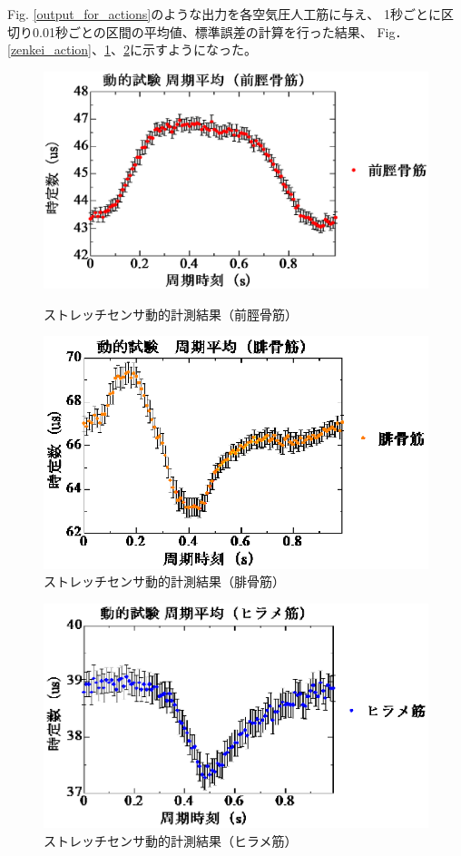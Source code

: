 Fig. \ref{output_for_actions}のような出力を各空気圧人工筋に与え、
1秒ごとに区切り0.01秒ごとの区間の平均値、標準誤差の計算を行った結果、
Fig．\ref{zenkei_action}、\ref{hikotsu_action}、\ref{hirame_action}に示すようになった。
\begin{figure}[h]
  \begin{center}
  \includegraphics[width=0.75\columnwidth,clip]{./4_consideration/moving/zenkei.eps}
  \caption{ストレッチセンサ動的計測結果（前脛骨筋）}
  \label{zenkei_action}
  \end{center}
  \begin{center}
  \includegraphics[width=0.75\columnwidth,clip]{./4_consideration/moving/hikotsu.eps}
  \caption{ストレッチセンサ動的計測結果（腓骨筋）}
  \label{hikotsu_action}
  \end{center}
\end{figure}

\clearpage

\begin{figure}[h]
  \begin{center}
  \includegraphics[width=0.75\columnwidth,clip]{./4_consideration/moving/hirame.eps}
  \caption{ストレッチセンサ動的計測結果（ヒラメ筋）}
  \label{hirame_action}
  \end{center}
\end{figure}

